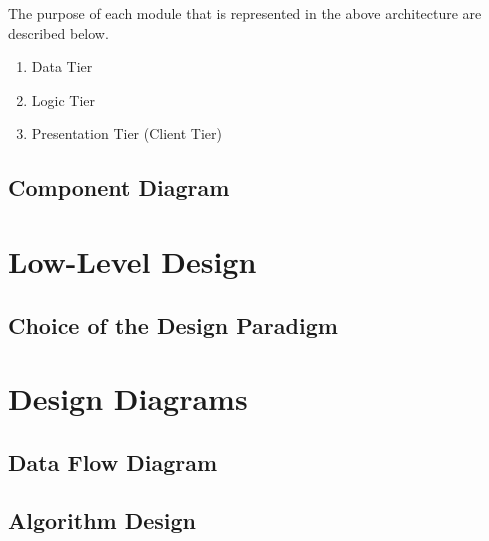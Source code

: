 The purpose of each module that is represented in the above architecture are described below.

\begin{enumerate}
\item Data Tier
\item Logic Tier
\item Presentation Tier (Client Tier)
\end{enumerate}



\subsection{Component Diagram}


\section{Low-Level Design}
\subsection{Choice of the Design Paradigm}


\section{Design Diagrams}

\subsection{Data Flow Diagram}

\subsection{Algorithm Design}


